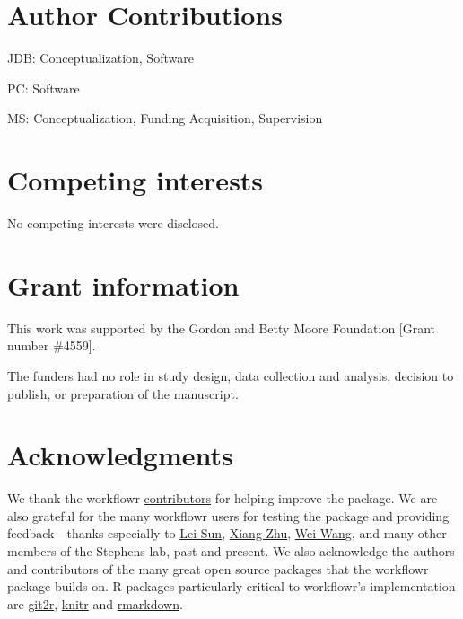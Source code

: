 \documentclass[9pt,a4paper]{extarticle}
\begin{document}
\section*{Author Contributions}

JDB: Conceptualization, Software

PC: Software

MS: Conceptualization, Funding Acquisition, Supervision


\section*{Competing interests}

No competing interests were disclosed.


\section*{Grant information}

This work was supported by the Gordon and Betty Moore Foundation [Grant
number \#4559].

The funders had no role in study design, data collection and analysis,
decision to publish, or preparation of the manuscript.


\section*{Acknowledgments}

We thank the workflowr
\href{https://github.com/jdblischak/workflowr/graphs/contributors}{contributors}
for helping improve the package. We are also grateful for the many
workflowr users for testing the package and providing feedback---thanks
especially to \href{https://github.com/LSun}{Lei Sun},
\href{https://github.com/xiangzhu}{Xiang Zhu},
\href{https://github.com/NKweiwang}{Wei Wang}, and many other members of
the Stephens lab, past and present. We also acknowledge the authors and
contributors of the many great open source packages that the workflowr
package builds on. R packages particularly critical to workflowr's
implementation are
\href{https://cran.r-project.org/web/packages/git2r/index.html}{git2r},
\href{https://github.com/yihui/knitr}{knitr} and
\href{http://rmarkdown.rstudio.com/}{rmarkdown}.

{\small

}
\end{document}
